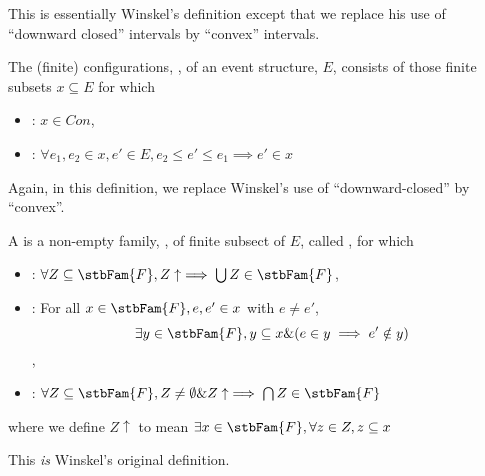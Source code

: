 This is essentially Winskel's definition except that we replace his use of
``downward closed'' intervals by ``convex'' intervals.

\begin{definition}
The (finite) configurations, , of an event structure, $E$, consists of
those finite subsets $x \subseteq E$ for which
\begin{itemize}
  \item {}: $x \in Con$,
  \item {}: $\forall e_1, e_2 \in x, e' \in E, e_2 \leq e'
    \leq e_1 \implies e' \in x$
\end{itemize}
\end{definition}

Again, in this definition, we replace Winskel's use of ``downward-closed'' by
``convex''.

\begin{definition}
A  is a non-empty family, , of finite
subsect of $E$, called , for which
\begin{itemize}
  \item {}: $\forall Z \subseteq \stbFam{F}, Z
    \uparrow \implies \bigcup Z \in \stbFam{F}$,
  \item {} : For all $x \in
    \stbFam{F}, e, e' \in x$ with $e \ne e'$, 
    $$ \exists y \in \stbFam{F}, y \subseteq x \& (e \in y \implies e' \notin y)$$,
  \item {} : $\forall Z \subseteq \stbFam{F}, Z \ne
    \emptyset \& Z \uparrow \implies \bigcap Z \in \stbFam{F}$
\end{itemize}
where we define $Z \uparrow$ to mean $\exists x \in \stbFam{F}, \forall z \in Z, z \subseteq x$ 
\end{definition}

This \emph{is} Winskel's original definition.
